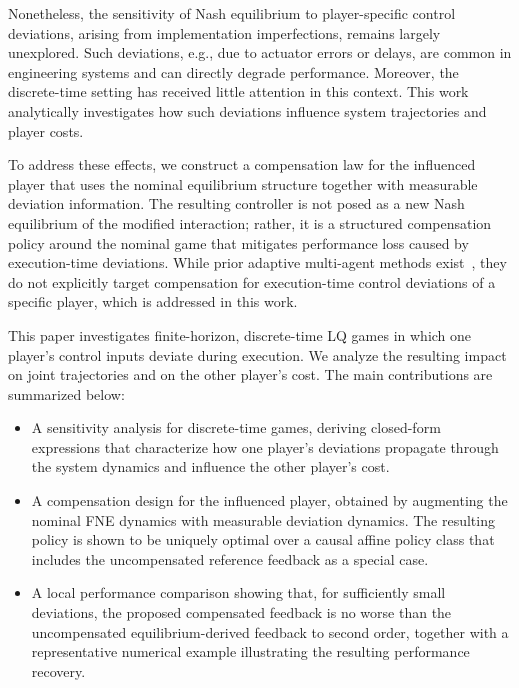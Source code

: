 \documentclass[letterpaper, 10 pt, conference]{ieeeconf}  %
\begin{document}
Nonetheless, the sensitivity of Nash equilibrium to player-specific control deviations, arising from implementation imperfections, remains largely unexplored. Such deviations, e.g., due to actuator errors or delays, are common in engineering systems and can directly degrade performance. Moreover, the discrete-time setting has received little attention in this context. This work analytically investigates how such deviations influence system trajectories and player costs.

To address these effects, we construct a compensation law for
the influenced player that uses the nominal equilibrium structure
together with measurable deviation information. The resulting
controller is not posed as a new Nash equilibrium of the modified
interaction; rather, it is a structured compensation policy around
the nominal game that mitigates performance loss caused by
execution-time deviations.
While prior adaptive multi-agent methods exist~\cite{guerrero2021openloop,wang2022risk}, they do not explicitly target compensation for execution-time control deviations of a specific player, which is addressed in this work.

This paper investigates finite-horizon, discrete-time LQ
games in which one player’s control inputs deviate during execution.
We analyze the resulting impact on joint trajectories and on the
other player’s cost. The main contributions are summarized below:
\begin{itemize}
    \item A sensitivity analysis for discrete-time games, deriving closed-form expressions that characterize how one player’s deviations propagate through the system dynamics and influence the other player’s cost.
    \item
    A compensation design for the influenced player, obtained
  by augmenting the nominal FNE dynamics with measurable deviation dynamics. The resulting policy is shown to be uniquely optimal over a causal affine policy class that includes the uncompensated reference feedback as a special case.
    \item  A local performance comparison showing that, for sufficiently small deviations, the proposed compensated feedback is no worse than the uncompensated equilibrium-derived feedback to second order, together with a representative numerical example illustrating the resulting performance recovery.
\end{itemize}
\end{document}
